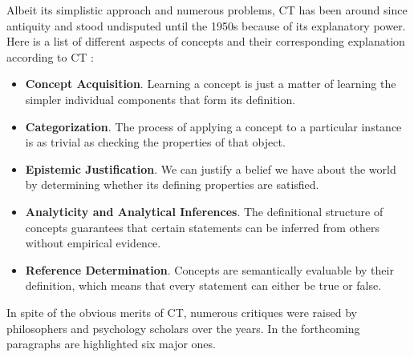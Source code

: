 Albeit its simplistic approach and numerous problems, CT has been around since antiquity and stood undisputed until the 1950s because of its explanatory power. Here is a list of different aspects of concepts and their corresponding explanation according to CT \cite{Laurence1999}:
\begin{itemize}
	\item \textbf{Concept Acquisition}. Learning a concept is just a matter of learning the simpler individual components that form its definition.
	\item \textbf{Categorization}. The process of applying a concept to a particular instance is as trivial as checking the properties of that object. 
	\item \textbf{Epistemic Justification}. We can justify a belief we have about the world by determining whether its defining properties are satisfied. 
	\item \textbf{Analyticity and Analytical Inferences}. The definitional structure of concepts guarantees that certain statements can be inferred from others without empirical evidence.
	\item \textbf{Reference Determination}. Concepts are semantically evaluable by their definition, which means that every statement can either be true or false.
\end{itemize}
In spite of the obvious merits of CT, numerous critiques were raised by philosophers and psychology scholars over the years. In the forthcoming paragraphs are highlighted six major ones.


